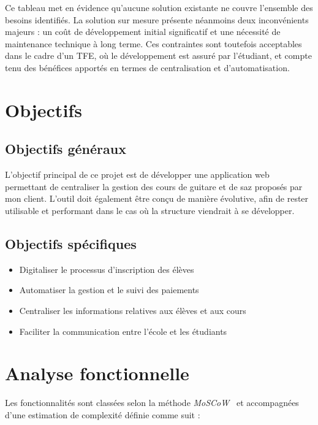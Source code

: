 \documentclass{article}
\begin{document}
Ce tableau met en évidence qu'aucune solution existante ne couvre 
l'ensemble des besoins identifiés. La solution sur mesure présente 
néanmoins deux inconvénients majeurs : un coût de développement 
initial significatif et une nécessité de maintenance technique 
à long terme. Ces contraintes sont toutefois acceptables dans 
le cadre d'un TFE, où le développement est assuré par l'étudiant, 
et compte tenu des bénéfices apportés en termes de centralisation 
et d'automatisation.

\section{Objectifs}

\subsection{Objectifs généraux}

L’objectif principal de ce projet est de développer une application web permettant de centraliser la gestion des cours de guitare et de saz proposés par mon client. L’outil doit également être conçu de manière évolutive, afin de rester utilisable et performant dans le cas où la structure viendrait à se développer.

\subsection{Objectifs spécifiques}

\begin{itemize}
\item Digitaliser le processus d’inscription des élèves
\item Automatiser la gestion et le suivi des paiements
\item Centraliser les informations relatives aux élèves et aux cours
\item Faciliter la communication entre l’école et les étudiants
\end{itemize}

\section{Analyse fonctionnelle}

Les fonctionnalités sont classées selon la méthode \textit{MoSCoW}~\cite{moscow} 
et accompagnées d'une estimation de complexité définie comme suit :
\end{document}
